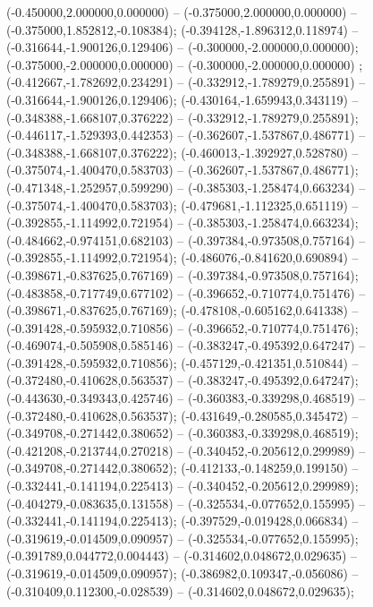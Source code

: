  (-0.450000,2.000000,0.000000) -- (-0.375000,2.000000,0.000000) -- (-0.375000,1.852812,-0.108384);
 (-0.394128,-1.896312,0.118974) -- (-0.316644,-1.900126,0.129406) -- (-0.300000,-2.000000,0.000000);
 (-0.375000,-2.000000,0.000000) -- (-0.300000,-2.000000,0.000000) ;
 (-0.412667,-1.782692,0.234291) -- (-0.332912,-1.789279,0.255891) -- (-0.316644,-1.900126,0.129406);
 (-0.430164,-1.659943,0.343119) -- (-0.348388,-1.668107,0.376222) -- (-0.332912,-1.789279,0.255891);
 (-0.446117,-1.529393,0.442353) -- (-0.362607,-1.537867,0.486771) -- (-0.348388,-1.668107,0.376222);
 (-0.460013,-1.392927,0.528780) -- (-0.375074,-1.400470,0.583703) -- (-0.362607,-1.537867,0.486771);
 (-0.471348,-1.252957,0.599290) -- (-0.385303,-1.258474,0.663234) -- (-0.375074,-1.400470,0.583703);
 (-0.479681,-1.112325,0.651119) -- (-0.392855,-1.114992,0.721954) -- (-0.385303,-1.258474,0.663234);
 (-0.484662,-0.974151,0.682103) -- (-0.397384,-0.973508,0.757164) -- (-0.392855,-1.114992,0.721954);
 (-0.486076,-0.841620,0.690894) -- (-0.398671,-0.837625,0.767169) -- (-0.397384,-0.973508,0.757164);
 (-0.483858,-0.717749,0.677102) -- (-0.396652,-0.710774,0.751476) -- (-0.398671,-0.837625,0.767169);
 (-0.478108,-0.605162,0.641338) -- (-0.391428,-0.595932,0.710856) -- (-0.396652,-0.710774,0.751476);
 (-0.469074,-0.505908,0.585146) -- (-0.383247,-0.495392,0.647247) -- (-0.391428,-0.595932,0.710856);
 (-0.457129,-0.421351,0.510844) -- (-0.372480,-0.410628,0.563537) -- (-0.383247,-0.495392,0.647247);
 (-0.443630,-0.349343,0.425746) -- (-0.360383,-0.339298,0.468519) -- (-0.372480,-0.410628,0.563537);
 (-0.431649,-0.280585,0.345472) -- (-0.349708,-0.271442,0.380652) -- (-0.360383,-0.339298,0.468519);
 (-0.421208,-0.213744,0.270218) -- (-0.340452,-0.205612,0.299989) -- (-0.349708,-0.271442,0.380652);
 (-0.412133,-0.148259,0.199150) -- (-0.332441,-0.141194,0.225413) -- (-0.340452,-0.205612,0.299989);
 (-0.404279,-0.083635,0.131558) -- (-0.325534,-0.077652,0.155995) -- (-0.332441,-0.141194,0.225413);
 (-0.397529,-0.019428,0.066834) -- (-0.319619,-0.014509,0.090957) -- (-0.325534,-0.077652,0.155995);
 (-0.391789,0.044772,0.004443) -- (-0.314602,0.048672,0.029635) -- (-0.319619,-0.014509,0.090957);
 (-0.386982,0.109347,-0.056086) -- (-0.310409,0.112300,-0.028539) -- (-0.314602,0.048672,0.029635);
